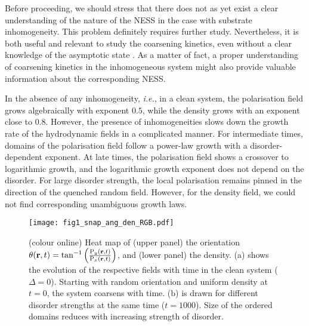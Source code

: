 \documentclass[pre,twocolumn,amssymb,showpacs,superscriptaddress,notitlepage]{revtex4-1}
\begin{document}
Before proceeding, we should stress that there does not as yet exist a clear understanding of the nature of the NESS in the case with substrate inhomogeneity. This problem definitely requires further study. Nevertheless, it is both useful and relevant to study the coarsening kinetics, even without a clear knowledge of the asymptotic state \cite{puribook}. As a matter of fact, a proper understanding of coarsening kinetics in the inhomogeneous system might also provide valuable information about the corresponding NESS.

In the absence of any inhomogeneity, {\it i.e.}, in a clean system, the  polarisation field grows algebraically with exponent $0.5$, while the density grows with an exponent close to $0.8$. However, the presence of inhomogeneities slows down the growth rate of the hydrodynamic fields in a complicated manner. For intermediate times, domains of the polarisation field follow a power-law growth with a disorder-dependent exponent. At late times, the polarisation field shows a crossover to logarithmic growth, and the logarithmic growth exponent does not depend on the disorder. For large disorder strength, the local polarisation remains pinned in the direction of the quenched random field. However, for the density field, we could not find corresponding unambiguous growth laws.


\begin{figure*}[t]
  \begin{center}
   \texttt{[image: fig1\_snap\_ang\_den\_RGB.pdf]}
\caption{(colour online)
Heat map of (upper panel) the orientation  $\theta({\bf r},t)=\tan^{-1}\left({\frac{{\rm P}_y({\bf r},t)}{{\rm P}_x({\bf r},t)}}\right)$, 
and (lower panel) the density. (a) shows the evolution of the respective fields with time in the clean 
system ($\Delta=0$). Starting with random orientation and uniform density at $t=0$, the system coarsens with time.
(b) is drawn for different disorder strengths at the same time ($t=1000$). Size of the ordered domains reduces with increasing 
strength of disorder.}
\label{fig1}
\end{center}
\end{figure*}

\end{document}
